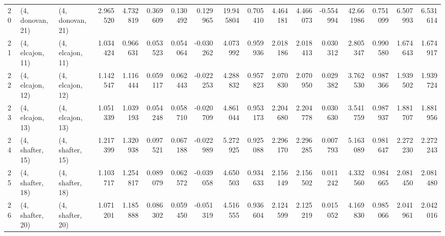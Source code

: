 \begin{tabular}{lllrrrrrrrrrrrrrr}
20 &  (4, donovan, 21) &  (4, donovan, 21) &  2.965520 &  4.732819 &   0.369609 &  0.130492 &  0.129965 &  19.945804 &  0.705410 &   4.464181 &  4.466073 & -0.554994 &  42.661986 &  0.751099 &  6.507993 &  6.531614 \\
21 &  (4, elcajon, 11) &  (4, elcajon, 11) &  1.034424 &  0.966631 &   0.053523 &  0.054064 & -0.030262 &   4.073992 &  0.959936 &   2.018186 &  2.018413 &  0.030312 &   2.805347 &  0.990580 &  1.674643 &  1.674917 \\
22 &  (4, elcajon, 12) &  (4, elcajon, 12) &  1.142547 &  1.116444 &   0.059117 &  0.062443 & -0.022253 &   4.288832 &  0.957823 &   2.070830 &  2.070950 &  0.029382 &   3.762530 &  0.987366 &  1.939502 &  1.939724 \\
23 &  (4, elcajon, 13) &  (4, elcajon, 13) &  1.051339 &  1.039193 &   0.054248 &  0.058710 & -0.020709 &   4.861044 &  0.953173 &   2.204680 &  2.204778 &  0.030630 &   3.541759 &  0.987937 &  1.881707 &  1.881956 \\
24 &  (4, shafter, 15) &  (4, shafter, 15) &  1.217399 &  1.320938 &   0.097521 &  0.067188 & -0.022989 &   5.272925 &  0.925088 &   2.296170 &  2.296285 &  0.007793 &   5.163089 &  0.981647 &  2.272230 &  2.272243 \\
25 &  (4, shafter, 18) &  (4, shafter, 18) &  1.103717 &  1.254817 &   0.089079 &  0.062572 & -0.039058 &   4.650503 &  0.934633 &   2.156149 &  2.156502 &  0.011242 &   4.332560 &  0.984665 &  2.081450 &  2.081480 \\
26 &  (4, shafter, 20) &  (4, shafter, 20) &  1.071201 &  1.185888 &   0.086302 &  0.059450 & -0.051319 &   4.516555 &  0.936604 &   2.124599 &  2.125219 &  0.015052 &   4.169830 &  0.985066 &  2.041961 &  2.042016 \\
\bottomrule
\end{tabular}
